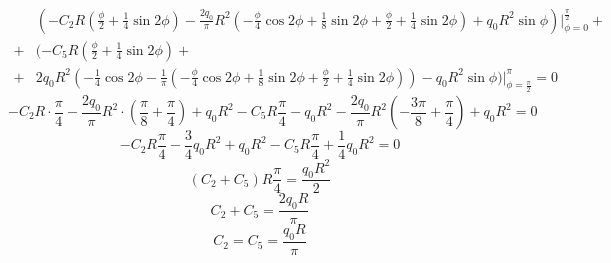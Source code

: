 \begin{enumerate}
\begin{equation}
\begin{split}
        \end{split}
    \end{equation}
    \begin{equation}
        \label{eq45}
        \begin{split}
            & (-C_2R(\frac{\phi}{2} + \frac{1}{4} \sin 2\phi) - \frac{2q_0}{\pi}R^2(-\frac{\phi}{4} \cos 2\phi + \frac{1}{8} \sin 2\phi + \frac{\phi}{2} + \frac{1}{4}\sin 2\phi) + q_0R^2 \sin \phi) \big|_{\phi = 0}^{\frac{\pi}{2}} +
            \\
            + & (-C_5R(\frac{\phi}{2} + \frac{1}{4} \sin 2\phi) + 
            \\
            + & 2q_0R^2(-\frac{1}{4}\cos 2\phi - \frac{1}{\pi}(-\frac{\phi}{4} \cos 2\phi + \frac{1}{8} \sin 2\phi + \frac{\phi}{2} + \frac{1}{4} \sin 2\phi)) - q_0R^2 \sin \phi) \big|_{\phi = \frac{\pi}{2}}^\pi = 0
        \end{split}
    \end{equation}
    \begin{equation}
        \label{eq46}
        -C_2R \cdot \frac{\pi}{4} - \frac{2q_0}{\pi}R^2 \cdot (\frac{\pi}{8} + \frac{\pi}{4}) + q_0R^2 - C_5R \frac{\pi}{4} - q_0R^2 - \frac{2q_0}{\pi}R^2 (-\frac{3\pi}{8} + \frac{\pi}{4}) + q_0R^2 = 0
    \end{equation}
    \begin{equation}
        \label{eq47}
        -C_2R \frac{\pi}{4} - \frac{3}{4}q_0R^2 + q_0R^2 - C_5R \frac{\pi}{4} + \frac{1}{4}q_0R^2 = 0
    \end{equation}
    \begin{equation}
        \label{eq48}
        (C_2 + C_5)R \frac{\pi}{4} = \frac{q_0R^2}{2}
    \end{equation}
    \begin{equation}
        \label{eq48.1}
        C_2 + C_5 = \frac{2q_0R}{\pi}
    \end{equation}
    \begin{equation}
        \label{eq49}
        C_2 = C_5 = \frac{q_0R}{\pi}
    \end{equation}
\end{enumerate}

